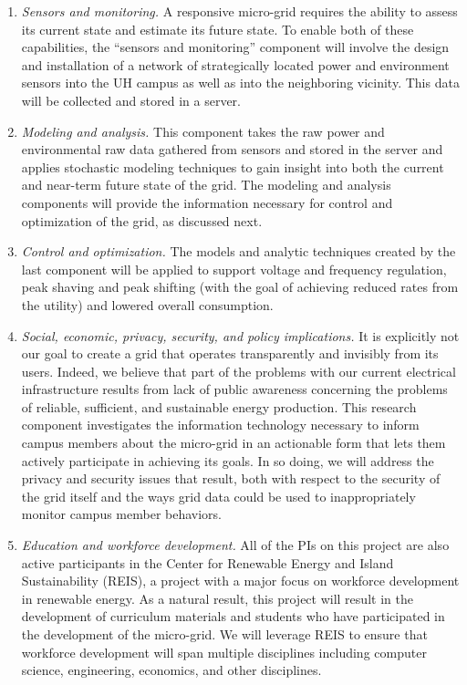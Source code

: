 \begin{enumerate}

\item {\em Sensors and monitoring.} A responsive micro-grid requires the
  ability to assess its current state and estimate its future state.  To
  enable both of these capabilities, the ``sensors and monitoring''
  component will involve the design and installation of a network of
  strategically located power and environment sensors into the UH campus as
  well as into the neighboring vicinity. This data will be collected and
  stored in a server.

\item {\em Modeling and analysis.}  This component takes the raw power and
  environmental raw data gathered from sensors and stored in the server and
  applies stochastic modeling techniques to gain insight into both the
  current and near-term future state of the grid.  The modeling and
  analysis components will provide the information necessary for control
  and optimization of the grid, as discussed next.

\item {\em Control and optimization.}  The models and analytic techniques
  created by the last component will be applied to support voltage and
  frequency regulation, peak shaving and peak shifting (with the goal of
  achieving reduced rates from the utility) and lowered overall
  consumption. 

\item {\em Social, economic, privacy, security, and policy implications.}
  It is explicitly not our goal to create a grid that operates
  transparently and invisibly from its users.  Indeed, we believe that part
  of the problems with our current electrical infrastructure results from
  lack of public awareness concerning the problems of reliable, sufficient,
  and sustainable energy production.  This research component investigates
  the information technology necessary to inform campus members about the
  micro-grid in an actionable form that lets them actively participate in
  achieving its goals.  In so doing, we will address the privacy and
  security issues that result, both with respect to the security of the
  grid itself and the ways grid data could be used to inappropriately
  monitor campus member behaviors.

\item {\em Education and workforce development.}  All of the PIs on this
  project are also active participants in the Center for Renewable Energy
  and Island Sustainability (REIS), a project with a major focus on
  workforce development in renewable energy.  As a natural result, this
  project will result in the development of curriculum materials and
  students who have participated in the development of the micro-grid.  We
  will leverage REIS to ensure that workforce development will span
  multiple disciplines including computer science, engineering, economics,
  and other disciplines.

\end{enumerate}

